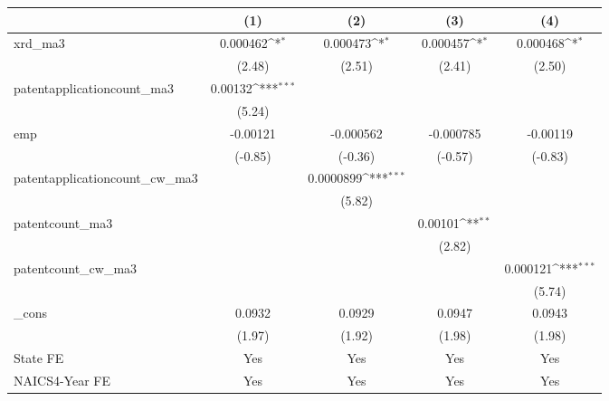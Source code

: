{
\def\sym#1{\ifmmode^{#1}\else\(^{#1}\)\fi}
\begin{tabular}{l*{4}{c}}
\hline\hline
            &\multicolumn{1}{c}{(1)}         &\multicolumn{1}{c}{(2)}         &\multicolumn{1}{c}{(3)}         &\multicolumn{1}{c}{(4)}         \\
\hline
xrd\_ma3     &    0.000462\sym{*}  &    0.000473\sym{*}  &    0.000457\sym{*}  &    0.000468\sym{*}  \\
            &      (2.48)         &      (2.51)         &      (2.41)         &      (2.50)         \\
[1em]
patentapplicationcount\_ma3&     0.00132\sym{***}&                     &                     &                     \\
            &      (5.24)         &                     &                     &                     \\
[1em]
emp         &    -0.00121         &   -0.000562         &   -0.000785         &    -0.00119         \\
            &     (-0.85)         &     (-0.36)         &     (-0.57)         &     (-0.83)         \\
[1em]
patentapplicationcount\_cw\_ma3&                     &   0.0000899\sym{***}&                     &                     \\
            &                     &      (5.82)         &                     &                     \\
[1em]
patentcount\_ma3&                     &                     &     0.00101\sym{**} &                     \\
            &                     &                     &      (2.82)         &                     \\
[1em]
patentcount\_cw\_ma3&                     &                     &                     &    0.000121\sym{***}\\
            &                     &                     &                     &      (5.74)         \\
[1em]
\_cons      &      0.0932         &      0.0929         &      0.0947         &      0.0943         \\
            &      (1.97)         &      (1.92)         &      (1.98)         &      (1.98)         \\
[1em]
State FE    &         Yes         &         Yes         &         Yes         &         Yes         \\
[1em]
NAICS4-Year FE&         Yes         &         Yes         &         Yes         &         Yes         \\

\end{tabular}}
